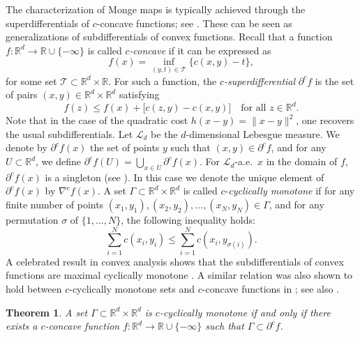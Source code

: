 \documentclass[11pt]{article}
\newcommand{\RR}{\mathbb{R}}
\newcommand{\R}{\RR}
\theoremstyle{plain}
\newtheorem{theorem}{Theorem}[section]
\theoremstyle{definition}\newtheorem{definition}[theorem]{Definition}
\theoremstyle{remark}
\begin{document}
The characterization of Monge maps is typically achieved through the superdifferentials of $c$-concave functions; see \cite{Villani.09}. These can be seen as generalizations of subdifferentials of convex functions. Recall that a function $f \colon \mathbb{R}^d \to \mathbb{R} \cup \{-\infty\}$ is called \textit{$c$-concave} if it can be expressed as
%
\begin{equation}
    \label{CLTgeneq:c_concave}
f(x) = \inf_{(y, t) \in \mathcal{T}} \big\{ c(x, y) - t \big\},
\end{equation}
%
for some set $\mathcal{T} \subset \mathbb{R}^d \times \mathbb{R}$.  For such a function, the \textit{$c$-superdifferential} $\partial^c f$ is the set of pairs $(x, y) \in \mathbb{R}^d \times \mathbb{R}^d$ satisfying
\begin{equation}
    \label{eq:def-superdiff}
    f(z) \leq f(x) + \big[ c(z, y) - c(x, y) \big] \quad \text{for all } z \in \mathbb{R}^d.
\end{equation}
%
Note that in the case of the quadratic cost $h(x-y)=\|x-y\|^2$, one recovers the usual subdifferentials. Let $\mathcal{L}_d$ be the $d$-dimensional Lebesgue measure. 
We denote by $\partial^c f(x)$ the set of points $y$ such that $(x, y) \in \partial^c f$, and for any $U \subset \mathbb{R}^d$, we define $\partial^c f(U) = \bigcup_{x \in U} \partial^c f(x)$. For $\mathcal{L}_d$-a.e.~$x$ in the domain of $f$,  $\partial^c f(x)$ is a singleton (see \cite{GangboMcCann.96}). In this case we denote the unique element of $\partial^c f(x)$ by $\nabla^c f(x)$.  A set $\Gamma \subset \R^d \times \R^d$ is called $c$-\textit{cyclically monotone} if for any finite number of points $(x_1, y_1), (x_2, y_2), \dots, (x_N, y_N)\in \Gamma$, and for any permutation $\sigma$ of $\{1, \dots, N\}$, the following inequality holds:
\[
\sum_{i=1}^{N} c(x_i, y_i) \le \sum_{i=1}^{N} c(x_i, y_{\sigma(i)}).
\]
%
A celebrated result in convex analysis shows that the subdifferentials of convex functions are maximal cyclically monotone \citep{Rockafellar.70}. A similar relation was also shown to hold between  $c$-{cyclically monotone} sets and $c$-concave functions in \cite{Smith-Knott}; see also \cite[Theorem~2.7]{GangboMcCann.96}.
\begin{theorem}\label{theorem-c-cycl} A set $\Gamma\subset \R^d\times \R^d$ is $c$-cyclically 
    monotone if and only if there exists a $c$-concave function $f:\R^d\to \R\cup \{-\infty\} $ such that $\Gamma\subset \partial^c f$.  
\end{theorem}
\end{document}
